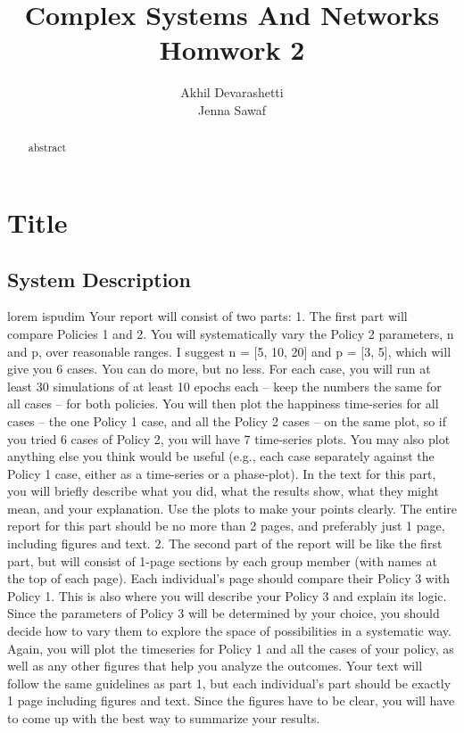 \documentclass[a4paper,12pt]{article}
\title{Complex Systems And Networks\\Homwork 2}
\author{Akhil Devarashetti\\Jenna Sawaf}
\begin{document}
  \maketitle

  \begin{abstract}
    abstract
  \end{abstract}

  \section{Title}
  \subsection{System Description}
  lorem ispudim
  Your report will consist of two parts:
  1. The first part will compare Policies 1 and 2. You will systematically vary the Policy 2 parameters,
  n and p, over reasonable ranges. I suggest n = [5, 10, 20] and p = [3, 5], which will give you 6
  cases. You can do more, but no less. For each case, you will run at least 30 simulations of at least
  10 epochs each – keep the numbers the same for all cases – for both policies. You will then plot
  the happiness time-series for all cases – the one Policy 1 case, and all the Policy 2 cases – on the
  same plot, so if you tried 6 cases of Policy 2, you will have 7 time-series plots. You may also plot
  anything else you think would be useful (e.g., each case separately against the Policy 1 case,
  either as a time-series or a phase-plot). In the text for this part, you will briefly describe what you
  did, what the results show, what they might mean, and your explanation. Use the plots to make
  your points clearly. The entire report for this part should be no more than 2 pages, and preferably
  just 1 page, including figures and text.
  2. The second part of the report will be like the first part, but will consist of 1-page sections by each
  group member (with names at the top of each page). Each individual’s page should compare their
  Policy 3 with Policy 1. This is also where you will describe your Policy 3 and explain its logic.
  Since the parameters of Policy 3 will be determined by your choice, you should decide how to
  vary them to explore the space of possibilities in a systematic way. Again, you will plot the timeseries for Policy 1 and all the cases of your policy, as well as any other figures that help you
  analyze the outcomes. Your text will follow the same guidelines as part 1, but each individual’s
  part should be exactly 1 page including figures and text. Since the figures have to be clear, you
  will have to come up with the best way to summarize your results.
\end{document}
